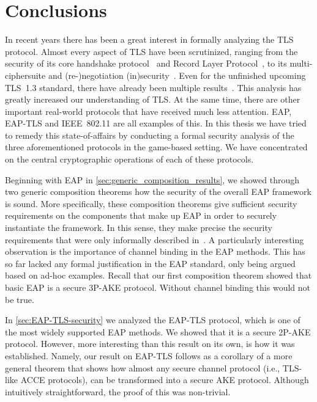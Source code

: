\chapter{Conclusions}\label{sec:conclusions}

\begingroup
\hypersetup{linkcolor=black}
\minitoc
\endgroup

In recent years there has been a great interest in formally analyzing the TLS protocol.
Almost every aspect of TLS have been scrutinized,
ranging from the security of its core handshake protocol~\cite{JC:MorSmaWar10,C:JKSS12,C:KraPatWee13,BrzuskaFSWW:2012:less_is_more,EPRINT:KohSchSch13,PKC:LSYKS14,C:BFKPSZ14}
and Record Layer Protocol~\cite{C:Krawczyk01,AC:PatRisShr11,RSA:BHMS16},
to its multi-ciphersuite and (re-)negotiation (in)security~\cite{CCS:GieKohSte13,CCS:BDKSS14,ACISP:DowSte15,SP:BBDFKP15}.
Even for the unfinished upcoming TLS~1.3 standard,
there have already been multiple results~\cite{PROVSEC:BMMRT15,CCS:DFGS15,EPRINT:KraWee15,EPRINT:DFGS16,FischlinG:2017:TLS1.3_0-RTT}.
This analysis has greatly increased our understanding of TLS.
At the same time,
there are other important real-world protocols that have received much less attention.
EAP, EAP-TLS and IEEE~802.11 are all examples of this.
In this thesis we have tried to remedy this state-of-affairs
by conducting a formal security analysis of the three aforementioned protocols in the game-based  setting.
We have concentrated on the central cryptographic operations of each of these protocols.

Beginning with EAP in \cref{sec:generic_composition_results},
we showed through two generic composition theorems how the security of the overall EAP framework is sound.
More specifically,
these composition theorems give sufficient security requirements on the components that make up EAP in order to securely instantiate the framework.
In this sense,
they make precise the security requirements that were only informally described in~\cite{IETF:RFC5247:EAP-key-management}.
A particularly interesting observation is the importance of channel binding in the EAP methods.
This has so far lacked any formal justification in the EAP standard,
only being argued based on ad-hoc examples.
Recall that our first composition theorem showed that basic EAP is a secure 3P-AKE protocol.
Without channel binding this would not be true.


In \cref{sec:EAP-TLS-security} we analyzed the EAP-TLS protocol,
which is one of the most widely supported EAP methods.
We showed that it is a secure 2P-AKE protocol.
However,
more interesting than this result on its own,
is how it was established.
Namely,
our result on EAP-TLS follows as a corollary of a more general theorem that shows how almost any secure channel protocol 
(i.e., TLS-like ACCE protocols),
can be transformed into a secure AKE protocol.
Although intuitively straightforward,
the proof of this was non-trivial.


